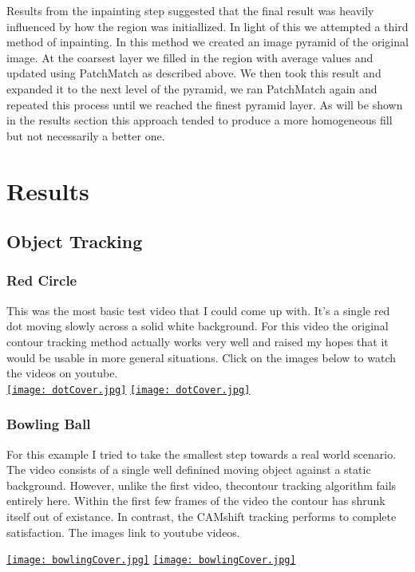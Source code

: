 \documentclass[12pt]{article}
\begin{document}
Results from the inpainting step suggested that the final result was heavily influenced by how the region was initiallized. In light of this we attempted a third method of inpainting. In this method we created an image pyramid of the original image. At the coarsest layer we filled in the region with average values and updated using PatchMatch as described above. We then took this result and expanded it to the next level of the pyramid, we ran PatchMatch again and repeated this process until we reached the finest pyramid layer. As will be shown in the results section this approach tended to produce a more homogeneous fill but not necessarily a better one.

\section{Results}
\subsection{Object Tracking}
\subsubsection{Red Circle}
This was the most basic test video that I could come up with. It's a single red dot moving slowly across a solid white background. For this video the original contour tracking method actually works very well and raised my hopes that it would be usable in more general situations. Click on the images below to watch the videos on youtube.\\

\href{https://www.youtube.com/watch?v=G7Jh-3KdVLg}{\texttt{[image: dotCover.jpg]}}
\href{https://www.youtube.com/watch?v=RdVge1ayv8o}{\texttt{[image: dotCover.jpg]}}

\subsubsection{Bowling Ball}
For this example I tried to take the smallest step towards a real world scenario. The video consists of a single well definined moving object against a static background. However, unlike the first video, thecontour tracking algorithm fails entirely here. Within the first few frames of the video the contour has shrunk itself out of existance. In contrast, the CAMshift tracking performs to complete satisfaction. The images link to youtube videos.

\href{https://www.youtube.com/watch?v=bA38ntzGErc&feature=youtu.be}{\texttt{[image: bowlingCover.jpg]}}
\href{https://www.youtube.com/watch?v=XLbP9vWncK0}{\texttt{[image: bowlingCover.jpg]}}
\end{document}
